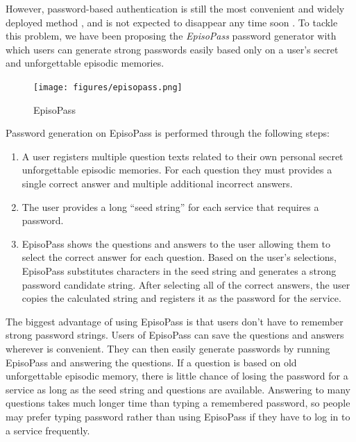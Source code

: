 \documentclass[sigconf]{acmart}
\begin{document}
However, password-based authentication is still the most convenient
and widely deployed method \cite{Bonneau:ReplacePasswords}, and is not
expected to disappear any time soon \cite{Herley:2009:PSS:1601990.1602010}.
%
To tackle this problem,
we have been proposing the \textit{EpisoPass} password generator with which 
users can generate strong passwords easily
based only on a user's secret and unforgettable episodic memories.


\begin{figure}[H]
  \centerline{\texttt{[image: figures/episopass.png]}}
  \caption{EpisoPass}
  \label{EpisoPass}
\end{figure}

Password generation on EpisoPass is performed through the following steps:

\begin{enumerate}
\item A user registers multiple question texts related to their own personal
secret unforgettable episodic memories. For each question they must provides
a single correct answer and multiple additional incorrect answers.

\item The user provides a long ``seed string'' for each service that requires
a password.

\item EpisoPass shows the questions and answers to the user allowing
them to select the correct answer for each question.
Based on the user's selections,
EpisoPass substitutes characters in the seed string and generates a
strong password candidate string.
After selecting all of the correct answers,
the user copies the calculated string
and registers it as the password for the service.
\end{enumerate}

The biggest advantage of using EpisoPass is that
users don't have to remember strong password strings.
%
Users of EpisoPass can save the questions and answers
wherever is convenient. They can
then easily generate passwords by running
EpisoPass and answering the questions.
%
If a question is based on old unforgettable episodic memory,
there is little chance of losing the password for a service
as long as the seed string and questions are available.
%
Answering to many questions takes much longer time than typing a
remembered password, so people may prefer typing password
rather than using EpisoPass if they have to log in to a service frequently.
\end{document}
